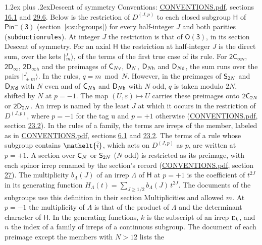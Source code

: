 \documentclass[10pt,a4paper]{article}
\makeatletter
\renewcommand\section{\@startsection{section}{1}{\z@}{-3ex plus -1ex minus -.2ex}%
  {1.2ex plus .2ex}{\normalfont\large\sffamily\bfseries\color{parttitle}}}
\numberwithin{equation}{section}
\newcommand{\eltfont}[1]{{\let\sigma\eltsigma\mathelt{#1}}}
\newcommand{\grp}[1]{\mathsf{#1}}
\newcommand{\irr}[1]{\text{\normalfont\scshape #1}}
\newcommand{\elt}[1]{\eltfont{#1}}
\newcommand{\ptag}[1]{\mathrm{#1}}
\newcommand{\irrJp}[2]{D^{(#1,#2)}}
\newcommand{\jm}[2]{\bigl\lvert{}^{#1}_{\,#2}\bigr\rangle}
\newcommand{\lift}[1]{\tilde{#1}}
\makeatother
\begin{document}
\section{Descent of symmetry}\label{s:subduction}
Conventions: \href{../../CONVENTIONS.pdf}{CONVENTIONS.pdf}, sections \href{../../../rotation/CONVENTIONS.pdf\#conv.16.1}{16.1} and \href{../../CONVENTIONS.pdf\#conv.29.6}{29.6}.
\leavevmode\label{n:irrep.Gamma.subgroup}Below is the restriction of $\irrJp{J}{p}$ to each closed subgroup $\grp{H}$ of $\grp{Pin^{-}(3)}$ (section~\ref{s:subgroups}) for every half-integer $J$ and both parities (\texttt{subductionrules}). At integer $J$ the restriction is that of \href{../../../rotation/data/pdf/O3.pdf}{$\grp{O(3)}$}, in its section Descent of symmetry. For an axial $\grp{H}$ the restriction at half-integer $J$ is the direct sum, over the kets $\jm{J}{m}$, of the terms of the first true case of its rule. For \href{2Cinfv.pdf}{$\grp{2C_{\infty v}}$}, \href{2Dinf.pdf}{$\grp{2D_{\infty }}$}, \href{2Dinfh.pdf}{$\grp{2D_{\infty h}}$} and the preimages of $\grp{C_{\mathnormal{N}v}}$, $\grp{D_{\mathnormal{N}}}$, $\grp{D_{\mathnormal{N}h}}$ and $\grp{D_{\mathnormal{N}d}}$, the sum runs over the pairs $\jm{J}{\pm m}$. \label{n:index.residue}In the rules, $q = m \bmod N$. However, in the preimages of $\grp{S_{2\mathnormal{N}}}$ and $\grp{D_{\mathnormal{N}d}}$ with $N$ even and of $\grp{C_{\mathnormal{N}h}}$ and $\grp{D_{\mathnormal{N}h}}$ with $N$ odd, $q$ is taken modulo $2N$, shifted by $N$ at $p = -1$. The map $(U, \varepsilon) \mapsto U$ carries these preimages onto $\grp{2C_{2\mathnormal{N}}}$ or $\grp{2D_{2\mathnormal{N}}}$. An irrep is named by the least $J$ at which it occurs in the restriction of $\irrJp{J}{p}$, where $p = -1$ for the tag $\ptag{u}$ and $p = +1$ otherwise (\href{../../CONVENTIONS.pdf}{CONVENTIONS.pdf}, section \href{../../CONVENTIONS.pdf\#conv.23.2}{23.2}). In the rules of a family, the terms are irreps of the member, labeled as in \href{../../CONVENTIONS.pdf}{CONVENTIONS.pdf}, sections \href{../../../rotation/CONVENTIONS.pdf\#conv.6.1}{6.1} and \href{../../CONVENTIONS.pdf\#conv.23.2}{23.2}. The terms of a rule whose subgroup contains $\elt{\lift{i}}$, which acts on $\irrJp{J}{p}$ as $p$, are written at $p = +1$. A section over $\grp{C_{\mathnormal{N}}}$ or $\grp{S_{2\mathnormal{N}}}$ ($N$ odd) is restricted as its preimage, with each spinor irrep renamed by the section's record (\href{../../CONVENTIONS.pdf}{CONVENTIONS.pdf}, section \href{../../CONVENTIONS.pdf\#conv.27}{27}). \label{n:function.multiplicity}\label{n:index.generating.variable}\label{n:function.generating}\label{n:function.generating.numerator}\label{n:irrep.Delta}The multiplicity $b_\Lambda(J)$ of an irrep $\Lambda$ of $\grp{H}$ at $p = +1$ is the coefficient of $t^{2J}$ in its generating function $H_\Lambda(t) = \sum_{J\ge1/2} b_\Lambda(J)\,t^{2J}$. The documents of the subgroups use this definition in their section Multiplicities and allowed $m$. At $p = -1$ the multiplicity of $\Lambda$ is that of the product of $\Lambda$ and the determinant character of $\grp{H}$. In the generating functions, $k$ is the subscript of an irrep $\irr{e}_{k}$, and $n$ the index of a family of irreps of a continuous subgroup. The document of each preimage except the members with $N > 12$ lists the 
\end{document}
